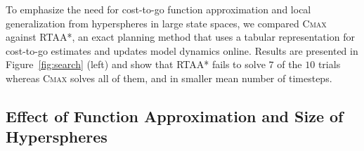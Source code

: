To emphasize the need for cost-to-go function approximation and
local generalization from hyperspheres in large state spaces, we compared \textsc{Cmax}
against RTAA*, an exact planning method that uses a tabular
representation for cost-to-go estimates and updates model dynamics
online. Results are presented in 
Figure~\ref{fig:search} (left) and show that RTAA* fails to solve $7$
of the $10$ trials whereas \textsc{Cmax} solves all of them, and in
smaller mean number of timesteps.


\subsection{Effect of Function Approximation and Size of Hyperspheres}
\label{sec:underst-effect-funct}
